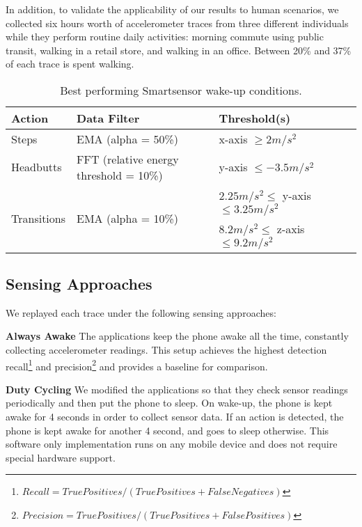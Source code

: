 In addition, to validate the applicability of our results to human
scenarios, we collected six hours worth of accelerometer traces from
three different individuals while they perform routine daily
activities: morning commute using public transit, walking in a retail
store, and walking in an office.  Between 20\% and 37\% of each trace
is spent walking.



\begin{table*}[t]
\centering
{\em
    \begin{tabular}{|l|l|l|l|}
	\hline
    Action      					& Data Filter 									& Threshold(s) \\ \hline
    Steps     					& EMA (alpha = 50\%) 						& x-axis $\geq 2 m/s^2$ 		\\ \hline
	Headbutts   					& FFT (relative energy threshold = 10\%) 	& y-axis $\leq -3.5 m/s^2$ 		\\ \hline
	\multirow{2}{*}{Transitions} 	& \multirow{2}{*}{EMA (alpha = 10\%)}		& $2.25 m/s^2 \leq$ y-axis $\leq 3.25 m/s^2$ 	\\ 
									&												& $8.2 m/s^2 \leq$ z-axis $\leq 9.2 m/s^2$ 	\\ \hline
    \end{tabular}
}
	\caption{Best performing Smartsensor wake-up conditions.}
	\label{table:WUCparameters}
\end{table*}


\subsection{Sensing Approaches}

We replayed each trace under the following sensing approaches:

\textbf{Always Awake} The applications keep the phone awake all the
time, constantly collecting accelerometer readings.  This setup
achieves the highest detection
recall\footnote{$Recall=TruePositives/(TruePositives+FalseNegatives)$}
and
precision\footnote{$Precision=TruePositives/(TruePositives+FalsePositives)$}
and provides a baseline for comparison.

\textbf{Duty Cycling} We modified the applications so that they check
sensor readings periodically and then put the phone to sleep.  On
wake-up, the phone is kept awake for 4 seconds in order to collect
sensor data.  If an action is detected, the phone is kept awake for
another 4 second, and goes to sleep otherwise.  This software only
implementation runs on any mobile device and does not require special
hardware support.

